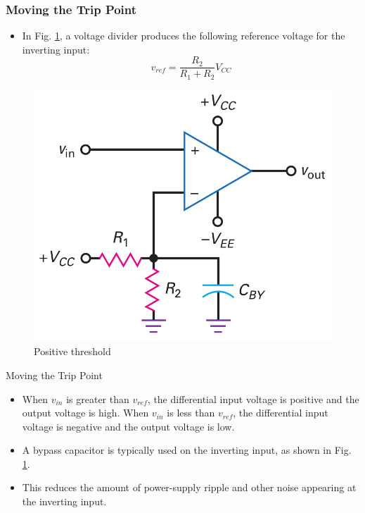 \documentclass[pdflatex,compress]{beamer}
\begin{document}
\begin{frame}
	\frametitle{Moving the Trip Point}
	\begin{multicols}{2}
		\begin{itemize}
			\item In Fig. \ref{fig:2011a}, a voltage divider produces the following reference voltage for the
			inverting input:
			\begin{equation}\label{eq:202}
				v_{ref} = \frac{R_2}{R_1 + R_2} V_{CC}
			\end{equation}
		\end{itemize}
		\columnbreak
		\begin{figure}
			\centering
			\includegraphics[width=\linewidth]{img/2011a}
			\caption{Positive threshold}
			\label{fig:2011a}
		\end{figure}
	\end{multicols}
\end{frame}

\begin{frame}{Moving the Trip Point}
	\begin{itemize}
		\item When $v_{in}$ is greater than $v_{ref}$, the differential input voltage is positive and the output voltage is high. When $v_{in}$ is less than $v_{ref}$, the differential input voltage is negative and the output voltage is low.
		\item A bypass capacitor is typically used on the inverting input, as shown in Fig. \ref{fig:2011a}. 
		\item This reduces the amount of power-supply ripple and other noise appearing at the inverting input.
	\end{itemize}
\end{frame}
\end{document}
